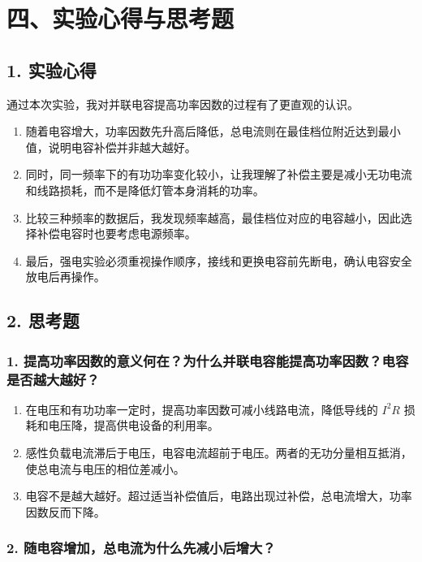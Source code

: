\clearpage
\section*{四、实验心得与思考题}

\subsection*{1. 实验心得}

通过本次实验，我对并联电容提高功率因数的过程有了更直观的认识。
\begin{enumerate}
\item 随着电容增大，功率因数先升高后降低，总电流则在最佳档位附近达到最小值，说明电容补偿并非越大越好。
\item 同时，同一频率下的有功功率变化较小，让我理解了补偿主要是减小无功电流和线路损耗，而不是降低灯管本身消耗的功率。
\item 比较三种频率的数据后，我发现频率越高，最佳档位对应的电容越小，因此选择补偿电容时也要考虑电源频率。
\item 最后，强电实验必须重视操作顺序，接线和更换电容前先断电，确认电容安全放电后再操作。

\end{enumerate}
\subsection*{2. 思考题}

\subsubsection*{1. 提高功率因数的意义何在？为什么并联电容能提高功率因数？电容是否越大越好？}

\begin{enumerate}
\item 在电压和有功功率一定时，提高功率因数可减小线路电流，降低导线的 $I^2R$ 损耗和电压降，提高供电设备的利用率。
\item 感性负载电流滞后于电压，电容电流超前于电压。两者的无功分量相互抵消，使总电流与电压的相位差减小。
\item 电容不是越大越好。超过适当补偿值后，电路出现过补偿，总电流增大，功率因数反而下降。

\end{enumerate}
\subsubsection*{2. 随电容增加，总电流为什么先减小后增大？}


